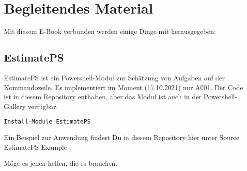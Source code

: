 \section{Begleitendes Material}

Mit diesem E-Book verbunden werden einige Dinge mit herausgegeben:


\subsection{EstimatePS}

EstimatePS ist ein Powershell-Modul zur Schätzung von Aufgaben auf der Kommandozeile. 
Es implementiert im Moment (17.10.2021) nur A001.
Der Code ist in diesem Repository enthalten, aber das Modul ist auch in der Powershell-Gallery verfügbar.

\begin{verbatim}
Install-Module EstimatePS
\end{verbatim}

Ein Beispiel zur Anwendung findest Du in diesem Repository hier unter Source\\EstimatePS-Example .

Möge es jenen helfen, die es brauchen.


